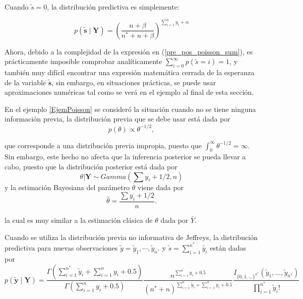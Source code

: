\documentclass[10pt,openright]{book}\usepackage[]{graphicx}\usepackage[]{color}
\begin{document}
    Cuando $\tilde{s}=0$, la distribuci\'on predictiva es simplemente:
    
    \begin{equation*}
    p(\tilde{\mathbf{s}} \mid \mathbf{Y})=
    \left(\frac{n+\beta}{n^*+n+\beta}\right)^{\sum_{i=1}^ny_i+\alpha}
    \end{equation*}
    
    Ahora, debido a la complejidad de la expresi\'on en (\ref{pre_pos_poisson_sum}), es pr\'acticamente imposible comprobar anal\'iticamente $\sum_{i=0}^\infty p(\tilde{s}=i)=1$, y tambi\'en muy dif\'icil encontrar una expresi\'on matem\'atica cerrada de la esperanza de la variable $\mathbf{\tilde{s}}$, sin embargo, en situaciones pr\'acticas, se puede usar aproximaciones num\'ericas tal como se ver\'a en el ejemplo al final de esta secci\'on.
    
    En el ejemplo \ref{EjemPoisson} se consider\'o la situaci\'on cuando no se tiene ninguna informaci\'on previa, la distribuci\'on previa que se debe usar est\'a dada por
    \begin{equation*}
    p(\theta)\propto\theta^{-1/2},
    \end{equation*}
    
    que corresponde a una distribuci\'on previa impropia, puesto que $\int_{0}^\infty \theta^{-1/2}=\infty$. Sin embargo, este hecho no afecta que la inferencia posterior se pueda llevar a cabo, puesto que la distribuci\'on posterior est\'a dada por
    \begin{equation*}
    \theta|\mathbf{Y}\sim Gamma(\sum y_i+1/2,n)
    \end{equation*}
    y la estimaci\'on Bayesiana del par\'ametro $\theta$ viene dada por 
    \begin{equation*}
    \hat{\theta}=\frac{\sum y_i+1/2}{n}.
    \end{equation*}
    
    la cual es muy similar a la estimaci\'on cl\'asica de $\theta$ dada por $\bar{Y}$.
    
    Cuando se utiliza la distribuci\'on previa no informativa de Jeffreys, la distribuci\'on predictiva para nuevas observaciones $\tilde{y}={\tilde{y}_1,\cdots,\tilde{y}_{n^*}}$ y $\tilde{s}=\sum_{i=1}^{n^*}\tilde{y_i}$ est\'an dadas por
    \begin{equation}\label{pred_posson_Jeffreys}
    p(\tilde{\mathbf{y}} \mid \mathbf{Y})=\frac{\Gamma(\sum_{i=1}^{n^*}\tilde{y}_i+\sum_{i=1}^ny_i+0.5)}{\Gamma(\sum_{i=1}^ny_i+0.5)}
    \frac{n^{\sum_{i=1}^ny_i+0.5}}{({n^*}+n)^{\sum_{i=1}^n\tilde{y}_i+\sum_{i=1}^ny_i+0.5}}
    \frac{I_{\{0,1,\ldots\}^{n^*}}(\tilde{y}_1,\ldots,\tilde{y}_{n^*})}{\prod_{i=1}^{n^*}\tilde{y}_i!}
    \end{equation}
    
\end{document}
